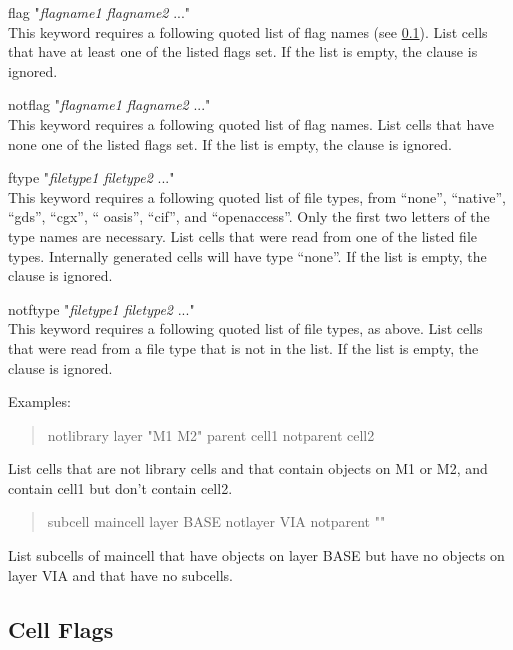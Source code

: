 \begin{description}
\item{{\vt flag "}{\it flagname1 flagname2} {\vt ..."}}\\
This keyword requires a following quoted list of flag names (see
\ref{cellflags}).  List cells that have at least one of the listed
flags set.  If the list is empty, the clause is ignored.
\item{{\vt notflag "}{\it flagname1 flagname2} {\vt ..."}}\\
This keyword requires a following quoted list of flag names.  List
cells that have none one of the listed flags set.  If the list is
empty, the clause is ignored.

\item{{\vt ftype "}{\it filetype1 filetype2} {\vt ..."}}\\
This keyword requires a following quoted list of file types, from
``{\vt none}'', ``{\vt native}'', ``{\vt gds}'', ``{\vt cgx}'', ``{\vt
oasis}'', ``{\vt cif}'', and ``{\vt openaccess}''.  Only the first two
letters of the type names are necessary.  List cells that were read
from one of the listed file types.  Internally generated cells will
have type ``{\vt none}''.  If the list is empty, the clause is
ignored.
\item{{\vt notftype "}{\it filetype1 filetype2} {\vt ..."}}\\
This keyword requires a following quoted list of file types, as above. 
List cells that were read from a file type that is not in the list. 
If the list is empty, the clause is ignored.
\end{description}

Examples:
\begin{quote} \vt
notlibrary layer "M1 M2" parent cell1 notparent cell2
\end{quote}
List cells that are not library cells and that contain objects on {\vt
M1} or {\vt M2}, and contain {\vt cell1} but don't contain {\vt
cell2}.

\begin{quote} \vt
subcell maincell layer BASE notlayer VIA notparent ""
\end{quote}
List subcells of {\vt maincell} that have objects on layer {\vt BASE}
but have no objects on layer {\vt VIA} and that have no subcells.

\subsection{Cell Flags}
\label{cellflags}

